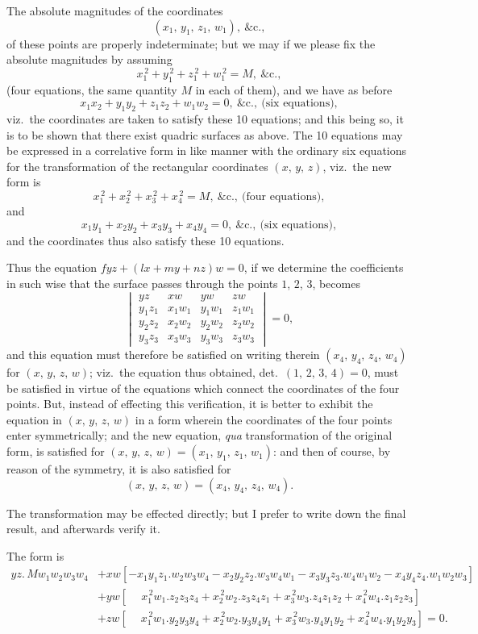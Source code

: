\documentclass[11pt,a4paper]{article}
\theoremstyle{plain}
\theoremstyle{definition}
\begin{document}
The absolute magnitudes of the coordinates
\[ (x_1,\, y_1,\, z_1,\, w_1),\ \&\text{c.}, \]
of these points are properly indeterminate; but we may if we please fix the absolute magnitudes by assuming
\[ x_1^{\,2} + y_1^{\,2} + z_1^{\,2} + w_1^{\,2} = M,\ \&\text{c.}, \]
(four equations, the same quantity $M$ in each of them), and we have as before
\[ x_1x_2 + y_1y_2 + z_1z_2 + w_1w_2 = 0,\ \&\text{c.},\ \text{(six equations)}, \]
viz.\ the coordinates are taken to satisfy these 10 equations; and this being so, it is to be shown that there exist quadric surfaces as above. The 10 equations may be expressed in a correlative form in like manner with the ordinary six equations for the transformation of the rectangular coordinates $(x,\, y,\, z)$, viz.\ the new form is
\[ x_1^{\,2} + x_2^{\,2} + x_3^{\,2} + x_4^{\,2} = M,\ \&\text{c.},\ \text{(four equations)}, \]
and
\[ x_1y_1 + x_2y_2 + x_3y_3 + x_4y_4 = 0,\ \&\text{c.},\ \text{(six equations)}, \]
and the coordinates thus also satisfy these 10 equations.

Thus the equation $fyz + (lx + my + nz)w = 0$, if we determine the coefficients in such wise that the surface passes through the points $1$, $2$, $3$, becomes
\[
\begin{vmatrix}
yz & xw & yw & zw \\
y_1z_1 & x_1w_1 & y_1w_1 & z_1w_1 \\
y_2z_2 & x_2w_2 & y_2w_2 & z_2w_2 \\
y_3z_3 & x_3w_3 & y_3w_3 & z_3w_3
\end{vmatrix} = 0,
\]
and this equation must therefore be satisfied on writing therein $(x_4,\, y_4,\, z_4,\, w_4)$ for $(x,\, y,\, z,\, w)$; viz.\ the equation thus obtained, det.\ $(1,\, 2,\, 3,\, 4) = 0$, must be satisfied in virtue of the equations which connect the coordinates of the four points. But, instead of effecting this verification, it is better to exhibit the equation in $(x,\, y,\, z,\, w)$ in a form wherein the coordinates of the four points enter symmetrically; and the new equation, \textit{qua} transformation of the original form, is satisfied for $(x,\, y,\, z,\, w) = (x_1,\, y_1,\, z_1,\, w_1)$: and then of course, by reason of the symmetry, it is also satisfied for
\[ (x,\, y,\, z,\, w) = (x_4,\, y_4,\, z_4,\, w_4). \]

The transformation may be effected directly; but I prefer to write down the final result, and afterwards verify it.

The form is
\begin{align*}
yz .\, Mw_1w_2w_3w_4 &+ xw[-x_1y_1z_1 . w_2w_3w_4 - x_2y_2z_2 . w_3w_4w_1 - x_3y_3z_3 . w_4w_1w_2 - x_4y_4z_4 . w_1w_2w_3] \\
&+ yw[\phantom{-}x_1^{\,2}w_1 . z_2z_3z_4 + x_2^{\,2}w_2 . z_3z_4z_1 + x_3^{\,2}w_3 . z_4z_1z_2 + x_4^{\,2}w_4 . z_1z_2z_3] \\
&+ zw[\phantom{-}x_1^{\,2}w_1 . y_2y_3y_4 + x_2^{\,2}w_2 . y_3y_4y_1 + x_3^{\,2}w_3 . y_4y_1y_2 + x_4^{\,2}w_4 . y_1y_2y_3] = 0.
\end{align*}
\end{document}
